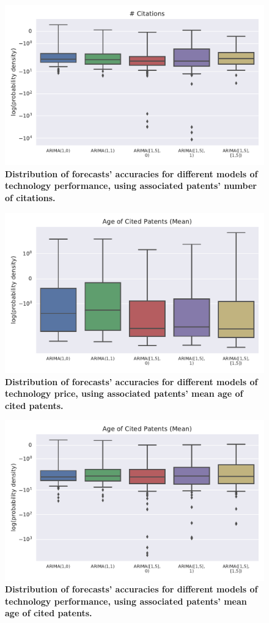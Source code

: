 \documentclass{article}
\begin{document}
\begin{figure}
    \centering
    \includegraphics[width=.75\textwidth]{figs/VAR_Model_Prediction_Citations_Backward_N_Performance.pdf}
    \caption{\textbf{Distribution of forecasts' accuracies for different models of technology performance, using associated patents' number of citations.}}
    \label{VAR_Model_Prediction_Citations_Backward_N_Performance}
\end{figure}

\begin{figure}
    \centering
    \includegraphics[width=.75\textwidth]{figs/VAR_Model_Prediction_Citations_Backward_Age_Mean_Price.pdf}
    \caption{\textbf{Distribution of forecasts' accuracies for different models of technology price, using associated patents' mean age of cited patents.}}
    \label{VAR_Model_Prediction_Citations_Backward_Age_Mean_Price}
\end{figure}

\begin{figure}
    \centering
    \includegraphics[width=.75\textwidth]{figs/VAR_Model_Prediction_Citations_Backward_Age_Mean_Performance.pdf}
    \caption{\textbf{Distribution of forecasts' accuracies for different models of technology performance, using associated patents' mean age of cited patents.}}
    \label{VAR_Model_Prediction_Citations_Backward_Age_Mean_Performance}
\end{figure}
\end{document}
